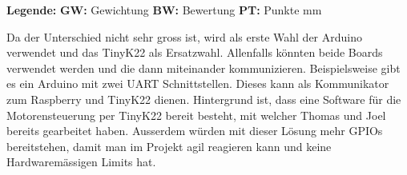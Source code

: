 \documentclass[../main.tex]{subfiles}
\begin{document}
    \begin{table}[H]
        \textbf{Legende:}
        \hspace{1cm}
        \textbf{GW:} Gewichtung
        \hspace{1cm}
        \textbf{BW:} Bewertung
        \hspace{1cm}
        \textbf{PT:} Punkte
         mm
            \caption{Nutzwertanalyse der Mikrocontroller}
            \label{tab:konzept_nutzwertanalyse_mikrocontroller}
        \end{table}

    Da der Unterschied nicht sehr gross ist, wird als erste Wahl der Arduino verwendet und das TinyK22 als Ersatzwahl. Allenfalls könnten beide Boards verwendet werden und die dann miteinander kommunizieren. Beispielsweise gibt es ein Arduino mit zwei UART Schnittstellen. Dieses kann als Kommunikator zum Raspberry und TinyK22 dienen. Hintergrund ist, dass eine Software für die Motorensteuerung per TinyK22 bereit besteht, mit welcher Thomas und Joel bereits gearbeitet haben. Ausserdem würden mit dieser Lösung mehr GPIOs bereitstehen, damit man im Projekt agil reagieren kann und keine Hardwaremässigen Limits hat.
\end{document}
